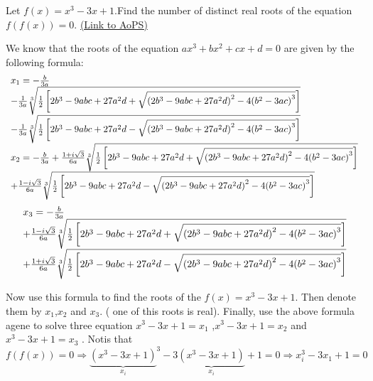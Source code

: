\begin{problem}
	Let $f(x)=x^3-3x+1$.Find the number of distinct real roots of the equation$ f(f(x))=0$.
	\flushright \href{https://artofproblemsolving.com/community/c6h529593}{(Link to AoPS)}
\end{problem}



\begin{solution}
	We know that the roots of the equation $ax^3+bx^2+cx+d=0 $ are given by the following formula:
\[\begin{array}{l}
{x_1} =  - \frac{b}{{3a}}\\
 - \frac{1}{{3a}}\sqrt[3]{{{\textstyle{1 \over 2}}\left[ {2{b^3} - 9abc + 27{a^2}d + \sqrt {{{\left( {2{b^3} - 9abc + 27{a^2}d} \right)}^2} - 4{{\left( {{b^2} - 3ac} \right)}^3}} } \right]}}\\
 - \frac{1}{{3a}}\sqrt[3]{{{\textstyle{1 \over 2}}\left[ {2{b^3} - 9abc + 27{a^2}d - \sqrt {{{\left( {2{b^3} - 9abc + 27{a^2}d} \right)}^2} - 4{{\left( {{b^2} - 3ac} \right)}^3}} } \right]}}\\
{x_2} =  - \frac{b}{{3a}} + \frac{{1 + i\sqrt 3 }}{{6a}}\sqrt[3]{{{\textstyle{1 \over 2}}\left[ {2{b^3} - 9abc + 27{a^2}d + \sqrt {{{\left( {2{b^3} - 9abc + 27{a^2}d} \right)}^2} - 4{{\left( {{b^2} - 3ac} \right)}^3}} } \right]}}\\
 + \frac{{1 - i\sqrt 3 }}{{6a}}\sqrt[3]{{{\textstyle{1 \over 2}}\left[ {2{b^3} - 9abc + 27{a^2}d - \sqrt {{{\left( {2{b^3} - 9abc + 27{a^2}d} \right)}^2} - 4{{\left( {{b^2} - 3ac} \right)}^3}} } \right]}}
\end{array}\]
\[\begin{array}{l}
{x_3} =  - \frac{b}{{3a}}\\
 + \frac{{1 - i\sqrt 3 }}{{6a}}\sqrt[3]{{{\textstyle{1 \over 2}}\left[ {2{b^3} - 9abc + 27{a^2}d + \sqrt {{{\left( {2{b^3} - 9abc + 27{a^2}d} \right)}^2} - 4{{\left( {{b^2} - 3ac} \right)}^3}} } \right]}}\\
 + \frac{{1 + i\sqrt 3 }}{{6a}}\sqrt[3]{{{\textstyle{1 \over 2}}\left[ {2{b^3} - 9abc + 27{a^2}d - \sqrt {{{\left( {2{b^3} - 9abc + 27{a^2}d} \right)}^2} - 4{{\left( {{b^2} - 3ac} \right)}^3}} } \right]}}
\end{array}\]

Now use this formula to find the roots of the $ f(x)=x^3-3x+1 $. Then denote them by ${{x}_{1}}$,${{x}_{2}}$  and ${{x}_{3}}$. ( one of this roots is real). Finally, use the above formula agene to solve three equation ${{x}^{3}}-3x+1={{x}_{1}}$   ,${{x}^{3}}-3x+1={{x}_{2}}$  and ${{x}^{3}}-3x+1={{x}_{3}}$ .
Notis that
$f(f(x))=0\Rightarrow {{\underbrace{({{x}^{3}}-3x+1)}_{{{x}_{i}}}}^{3}}-3\underbrace{({{x}^{3}}-3x+1)}_{{{x}_{i}}}+1=0\Rightarrow x_{i}^{3}-3{{x}_{1}}+1=0$
\end{solution}



